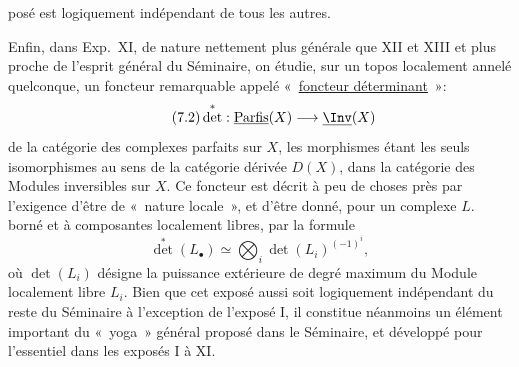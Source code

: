 pos\'e est
logiquement ind\'ependant de tous les autres.

Enfin, dans Exp.\ XI, de nature nettement plus g\'en\'erale que XII et XIII et plus proche de l'esprit g\'en\'eral du S\'eminaire, on \'etudie, sur un topos localement annel\'e quelconque, un foncteur remarquable appel\'e «~\uline{foncteur d\'eterminant}~»:
\begin{equation}\tag{7.2}
\det^*:\underline{\operatorname{Parfis}}(X)\longrightarrow \underline{\Inv}(X)
\end{equation}
de la cat\'egorie des complexes parfaits sur $X$, les morphismes \'etant les seuls isomorphismes au sens de la cat\'egorie d\'eriv\'ee $D(X)$, dans la cat\'egorie des Modules inversibles sur $X$. Ce foncteur est d\'ecrit \`a peu de choses pr\`es par l'exigence d'\^etre de «~nature locale~», et d'\^etre donn\'e, pour un complexe $L$. born\'e et \`a composantes localement libres, par la formule
\begin{equation}\tag{7 3}
\det^*(L_\bullet)\simeq\bigotimes_i \det(L_i)^{(-1)^i},
\end{equation}
o\`u $\det(L_i)$ d\'esigne la puissance ext\'erieure de degr\'e maximum du Module localement libre $L_i$. Bien que cet expos\'e aussi soit logiquement ind\'ependant du reste du S\'eminaire \`a l'exception de l'expos\'e I, il constitue n\'eanmoins un \'el\'ement important du «~yoga~» g\'en\'eral propos\'e dans le S\'eminaire, et d\'evelopp\'e pour l'essentiel dans les expos\'es I \`a XI.

